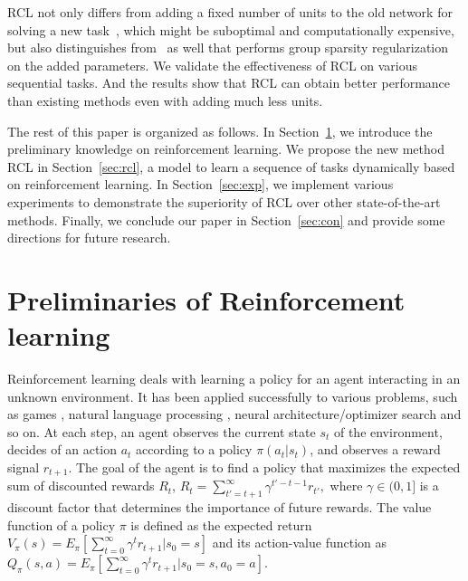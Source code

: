 \documentclass{article}
\begin{document}
RCL not only differs from adding a fixed number of units to the old network for solving a new task~\cite{rusu1}, which might be suboptimal and computationally expensive, but also distinguishes from~\cite{yoon1} as well that performs group sparsity regularization on the added  parameters.  We validate the effectiveness of RCL on various sequential tasks. And the results show that RCL can obtain better performance than existing methods even with adding much less units.


The rest of this paper is organized as follows. In Section~\ref{sec:pre}, we introduce the preliminary knowledge on reinforcement learning. We propose the new method RCL in Section~\ref{sec:rcl}, a model to learn a sequence of tasks dynamically based on reinforcement learning. In Section~\ref{sec:exp}, we implement various experiments to demonstrate the superiority of  RCL over other state-of-the-art methods. Finally, we conclude our paper in Section~\ref{sec:con} and provide some directions for future research.


\section{Preliminaries of Reinforcement learning} 
\label{sec:pre}
Reinforcement learning \cite{sutton1} deals with learning a policy for an
agent interacting in an unknown environment. It has been applied successfully to various problems, such as games \cite{minh1,silver1}, natural language processing \cite{yu1}, neural architecture/optimizer search \cite{zoph1,bello1} and so on. At each step,
an agent observes the current state $s_t$ of the environment,
decides of an action $a_t$ according to a policy $\pi(a_t | s_t)$, and observes
a reward signal $r_{t+1}$. The goal of the agent is to find a policy
that maximizes the expected sum of discounted rewards $R_t$,
$R_t = \sum_{t'=t+1}^\infty \gamma^{t'-t-1 }r_{t'},$
where $\gamma \in (0,1]$ is a discount factor that determines the importance of
future rewards. 
 The value function of a policy $\pi$ is defined as the expected return $V_{\pi}(s) = E_\pi[\sum_{t=0}^\infty\gamma^{t}r_{t+1}|s_0 = s]$ and its action-value function as $Q_{\pi}(s,a) = E_\pi[\sum_{t=0}^\infty\gamma^{t}r_{t+1}|s_0 = s, a_0 =a]$.
\end{document}
